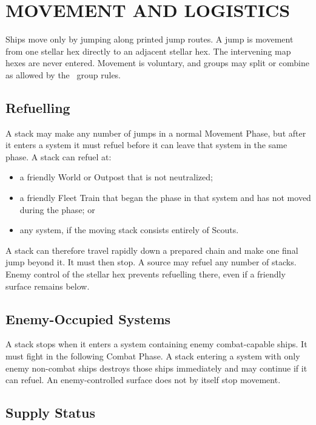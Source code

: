 \section{MOVEMENT AND LOGISTICS}

Ships move only by jumping along printed jump routes. A jump is movement from
one stellar hex directly to an adjacent stellar hex. The intervening map hexes
are never entered. Movement is voluntary, and groups may split or combine as
allowed by the \SpaceEmpires\ group rules.

\subsection{Refuelling}

A stack may make any number of jumps in a normal Movement Phase, but after it
enters a system it must refuel before it can leave that system in the same
phase. A stack can refuel at:

\begin{itemize}
  \item a friendly World or Outpost that is not neutralized;
  \item a friendly Fleet Train that began the phase in that system and has not
    moved during the phase; or
  \item any system, if the moving stack consists entirely of Scouts.
\end{itemize}

A stack can therefore travel rapidly down a prepared chain and make one final
jump beyond it. It must then stop. A source may refuel any number of stacks.
Enemy control of the stellar hex prevents refuelling there, even if a friendly
surface remains below.

\subsection{Enemy-Occupied Systems}

A stack stops when it enters a system containing enemy combat-capable ships.
It must fight in the following Combat Phase. A stack entering a system with
only enemy non-combat ships destroys those ships immediately and may continue
if it can refuel. An enemy-controlled surface does not by itself stop movement.

\subsection{Supply Status}


